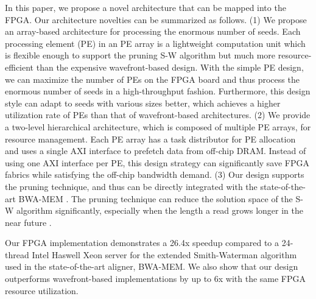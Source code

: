 In this paper, we propose a novel architecture that can be mapped into the FPGA.
Our architecture novelties can be summarized as follows.
(1)	We propose an array-based architecture for processing the enormous number of seeds.
Each processing element (PE) in an PE array is a lightweight computation unit which is flexible enough to support the pruning S-W algorithm 
but much more resource-efficient than the expensive wavefront-based design. 
With the simple PE design, we can maximize the number of PEs on the FPGA board 
and thus process the enormous number of seeds in a high-throughput fashion.
Furthermore, this design style can adapt to seeds with various sizes better, 
which achieves a higher utilization rate of PEs than that of wavefront-based architectures.
(2)	We provide a two-level hierarchical architecture, which is composed of multiple PE arrays, for resource management.
Each PE array has a task distributor for PE allocation and uses a single AXI interface to prefetch data from off-chip DRAM.
Instead of using one AXI interface per PE, this design strategy can significantly save FPGA fabrics while satisfying the off-chip bandwidth demand.
(3) Our design supports the pruning technique, and thus can be directly integrated with the state-of-the-art BWA-MEM \cite{BWA-MEM}. 
The pruning technique can reduce the solution space of the S-W algorithm significantly, 
especially when the length a read grows longer in the near future \cite{BWA-SW}\cite{BWA-MEM}.

Our FPGA implementation demonstrates a 26.4x speedup compared to a 24-thread Intel Haswell Xeon server for the extended Smith-Waterman algorithm used in the state-of-the-art aligner, BWA-MEM.
We also show that our design outperforms wavefront-based implementations by up to 6x with the same FPGA resource utilization.
